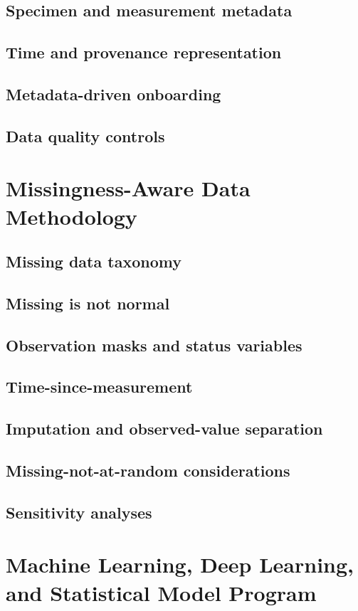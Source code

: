 \documentclass[11pt,journal,onecolumn,draftclsnofoot]{IEEEtran}
\begin{document}
\subsection{Specimen and measurement metadata}
\subsection{Time and provenance representation}
\subsection{Metadata-driven onboarding}
\subsection{Data quality controls}

\section{Missingness-Aware Data Methodology}
\subsection{Missing data taxonomy}
\subsection{Missing is not normal}
\subsection{Observation masks and status variables}
\subsection{Time-since-measurement}
\subsection{Imputation and observed-value separation}
\subsection{Missing-not-at-random considerations}
\subsection{Sensitivity analyses}

\section{Machine Learning, Deep Learning, and Statistical Model Program}
\end{document}
